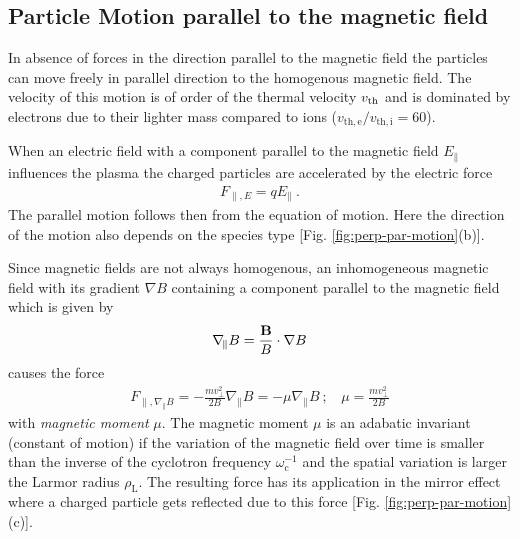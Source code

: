 \newpage

\subsection{Particle Motion parallel to the magnetic field}
\label{sub:parallelmotion}

In absence of forces in the direction parallel to the magnetic field the particles can move freely in parallel direction to the homogenous magnetic field. The velocity of this motion is of order of the thermal velocity $v_{\mathrm{th}}$ and is dominated by electrons due to their lighter mass compared to ions ($v_\mathrm{th,e}/v_\mathrm{th,i} = 60$). 

When an electric field with a component parallel to the magnetic field $E_\parallel$ influences the plasma the charged particles are accelerated by the electric force
\begin{gather}
    F_{\parallel,E} = qE_\parallel~.
    \label{eq:forceElectricParallel}
\end{gather}
The parallel motion follows then from the equation of motion. Here the direction of the motion also depends on the species type [Fig. \ref{fig:perp-par-motion}(b)].\\\bigskip

Since magnetic fields are not always homogenous, an inhomogeneous magnetic field with its gradient $\nabla B$ containing a component parallel to the magnetic field which is given by
\begin{gather}
    \nabla_{\!\parallel} B = \frac{\boldsymbol{\mathbf{B}}}{B} \cdot \nabla B 
    \label{eq:forceMagneticParallel}
\end{gather}
causes the force
\begin{gather}
    F_{\parallel,\nabla_{\!\parallel} B} = - \frac{mv^2_{\perp}}{2B} \nabla_{\!\parallel} B = - \mu \nabla_{\!\parallel} B~;~~~~\mu = \frac{mv^2_{\perp}}{2B}
    \label{eq:magneticMoment}
\end{gather}
with \textit{magnetic moment} $\mu$. The magnetic moment $\mu$ is an adabatic invariant (constant of motion) if the variation of the magnetic field over time is smaller than the inverse of the cyclotron frequency $\omega^{-1}_\mathrm{c}$ and the spatial variation is larger the Larmor radius $\rho_\mathrm{L}$. The resulting force has its application in the mirror effect where a charged particle gets reflected due to this force [Fig. \ref{fig:perp-par-motion}(c)]. \cite{Wesson2011}

\newpage

